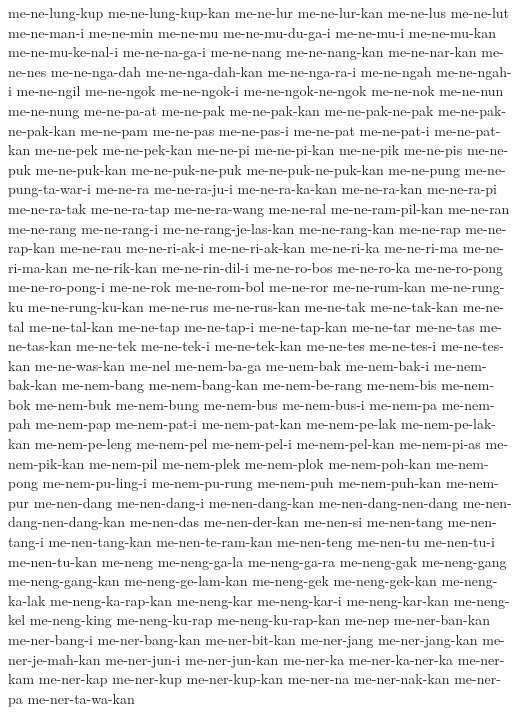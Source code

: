 {me-ne-lung-kup me-ne-lung-kup-kan me-ne-lur me-ne-lur-kan me-ne-lus
me-ne-lut me-ne-man-i me-ne-min me-ne-mu me-ne-mu-du-ga-i me-ne-mu-i
me-ne-mu-kan me-ne-mu-ke-nal-i me-ne-na-ga-i me-ne-nang me-ne-nang-kan
me-ne-nar-kan me-ne-nes me-ne-nga-dah me-ne-nga-dah-kan me-ne-nga-ra-i
me-ne-ngah me-ne-ngah-i me-ne-ngil me-ne-ngok me-ne-ngok-i
me-ne-ngok-ne-ngok me-ne-nok me-ne-nun me-ne-nung me-ne-pa-at me-ne-pak
me-ne-pak-kan me-ne-pak-ne-pak me-ne-pak-ne-pak-kan me-ne-pam me-ne-pas
me-ne-pas-i me-ne-pat me-ne-pat-i me-ne-pat-kan me-ne-pek me-ne-pek-kan
me-ne-pi me-ne-pi-kan me-ne-pik me-ne-pis me-ne-puk me-ne-puk-kan
me-ne-puk-ne-puk me-ne-puk-ne-puk-kan me-ne-pung me-ne-pung-ta-war-i
me-ne-ra me-ne-ra-ju-i me-ne-ra-ka-kan me-ne-ra-kan me-ne-ra-pi
me-ne-ra-tak me-ne-ra-tap me-ne-ra-wang me-ne-ral me-ne-ram-pil-kan
me-ne-ran me-ne-rang me-ne-rang-i me-ne-rang-je-las-kan me-ne-rang-kan
me-ne-rap me-ne-rap-kan me-ne-rau me-ne-ri-ak-i me-ne-ri-ak-kan
me-ne-ri-ka me-ne-ri-ma me-ne-ri-ma-kan me-ne-rik-kan me-ne-rin-dil-i
me-ne-ro-bos me-ne-ro-ka me-ne-ro-pong me-ne-ro-pong-i me-ne-rok
me-ne-rom-bol me-ne-ror me-ne-rum-kan me-ne-rung-ku me-ne-rung-ku-kan
me-ne-rus me-ne-rus-kan me-ne-tak me-ne-tak-kan me-ne-tal me-ne-tal-kan
me-ne-tap me-ne-tap-i me-ne-tap-kan me-ne-tar me-ne-tas me-ne-tas-kan
me-ne-tek me-ne-tek-i me-ne-tek-kan me-ne-tes me-ne-tes-i me-ne-tes-kan
me-ne-was-kan me-nel me-nem-ba-ga me-nem-bak me-nem-bak-i me-nem-bak-kan
me-nem-bang me-nem-bang-kan me-nem-be-rang me-nem-bis me-nem-bok
me-nem-buk me-nem-bung me-nem-bus me-nem-bus-i me-nem-pa me-nem-pah
me-nem-pap me-nem-pat-i me-nem-pat-kan me-nem-pe-lak me-nem-pe-lak-kan
me-nem-pe-leng me-nem-pel me-nem-pel-i me-nem-pel-kan me-nem-pi-as
me-nem-pik-kan me-nem-pil me-nem-plek me-nem-plok me-nem-poh-kan
me-nem-pong me-nem-pu-ling-i me-nem-pu-rung me-nem-puh me-nem-puh-kan
me-nem-pur me-nen-dang me-nen-dang-i me-nen-dang-kan me-nen-dang-nen-dang
me-nen-dang-nen-dang-kan me-nen-das me-nen-der-kan me-nen-si me-nen-tang
me-nen-tang-i me-nen-tang-kan me-nen-te-ram-kan me-nen-teng me-nen-tu
me-nen-tu-i me-nen-tu-kan me-neng me-neng-ga-la me-neng-ga-ra me-neng-gak
me-neng-gang me-neng-gang-kan me-neng-ge-lam-kan me-neng-gek
me-neng-gek-kan me-neng-ka-lak me-neng-ka-rap-kan me-neng-kar
me-neng-kar-i me-neng-kar-kan me-neng-kel me-neng-king me-neng-ku-rap
me-neng-ku-rap-kan me-nep me-ner-ban-kan me-ner-bang-i me-ner-bang-kan
me-ner-bit-kan me-ner-jang me-ner-jang-kan me-ner-je-mah-kan me-ner-jun-i
me-ner-jun-kan me-ner-ka me-ner-ka-ner-ka me-ner-kam me-ner-kap me-ner-kup
me-ner-kup-kan me-ner-na me-ner-nak-kan me-ner-pa me-ner-ta-wa-kan
}
